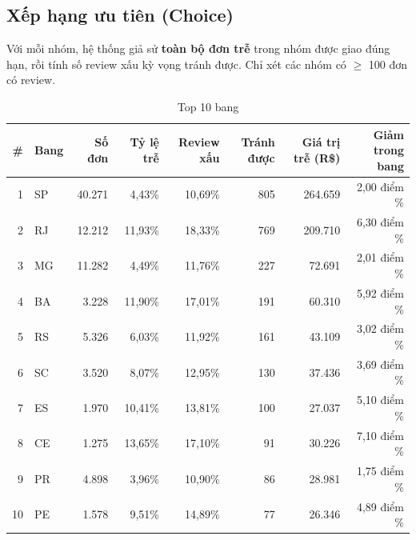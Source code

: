 \documentclass[12pt,a4paper]{report}
\renewcommand{\_}{\oldunderscore\allowbreak}
\begin{document}
\subsection{Xếp hạng ưu tiên (Choice)}\label{sec:ranking}

Với mỗi nhóm, hệ thống giả sử \textbf{toàn bộ đơn trễ} trong nhóm được giao đúng hạn, rồi tính số review xấu kỳ vọng tránh được. Chỉ xét các nhóm có $\ge$ 100 đơn có review.

\begin{table}[H]
\centering\small
\setlength{\tabcolsep}{4pt}
\caption{Top 10 bang}
\begin{tabular}{rlrrrrrr}
\toprule
\# & Bang & Số đơn & Tỷ lệ trễ & Review xấu & Tránh được & Giá trị trễ (R\$) & Giảm trong bang \\
\midrule
1 & SP & 40.271 & 4,43\% & 10,69\% & 805 & 264.659 & 2,00 điểm \% \\
2 & RJ & 12.212 & 11,93\% & 18,33\% & 769 & 209.710 & 6,30 điểm \% \\
3 & MG & 11.282 & 4,49\% & 11,76\% & 227 & 72.691 & 2,01 điểm \% \\
4 & BA & 3.228 & 11,90\% & 17,01\% & 191 & 60.310 & 5,92 điểm \% \\
5 & RS & 5.326 & 6,03\% & 11,92\% & 161 & 43.109 & 3,02 điểm \% \\
6 & SC & 3.520 & 8,07\% & 12,95\% & 130 & 37.436 & 3,69 điểm \% \\
7 & ES & 1.970 & 10,41\% & 13,81\% & 100 & 27.037 & 5,10 điểm \% \\
8 & CE & 1.275 & 13,65\% & 17,10\% & 91 & 30.226 & 7,10 điểm \% \\
9 & PR & 4.898 & 3,96\% & 10,90\% & 86 & 28.981 & 1,75 điểm \% \\
10 & PE & 1.578 & 9,51\% & 14,89\% & 77 & 26.346 & 4,89 điểm \% \\
\bottomrule
\end{tabular}
\end{table}
\end{document}
